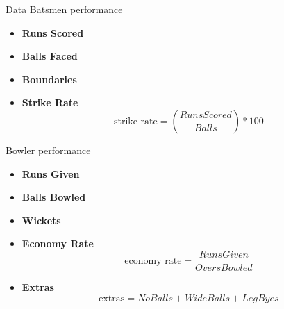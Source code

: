 \documentclass[
  10pt,
  ignorenonframetext,
  twocolumn]{beamer}
\providecommand{\tightlist}{%
  \setlength{\itemsep}{0pt}\setlength{\parskip}{0pt}}
\begin{document}
\begin{frame}{Data}
\protect\hypertarget{data-1}{}
Batsmen performance

\begin{itemize}
\tightlist
\item
  \textbf{Runs Scored}
\item
  \textbf{Balls Faced}
\item
  \textbf{Boundaries}
\item
  \textbf{Strike Rate} \[
   \text{strike rate} = (\frac{RunsScored}{Balls})*100
   \]
\end{itemize}

Bowler performance

\begin{itemize}
\item
  \textbf{Runs Given}
\item
  \textbf{Balls Bowled}
\item
  \textbf{Wickets}
\item
  \textbf{Economy Rate} \[
  \text{economy rate} = \frac{RunsGiven}{Overs Bowled}
  \]
\item
  \textbf{Extras} \[
  \text{extras} = No Balls + Wide Balls + Leg Byes
  \]
\end{itemize}
\end{frame}
\end{document}
